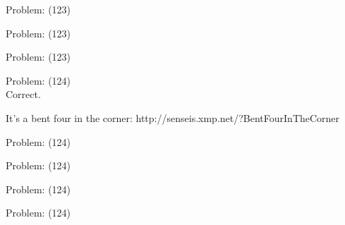 \documentclass[11pt]{article}
\begin{document}
\begin{minipage}[t]{0.5\textwidth}
  {\centering
  
Problem: (123)\\
  }
\end{minipage}
\begin{minipage}[t]{0.5\textwidth}
  {\centering
  
Problem: (123)\\
  }
\end{minipage}
\begin{minipage}[t]{0.5\textwidth}
  {\centering
  
Problem: (123)\\
  }
\end{minipage}
\begin{minipage}[t]{0.5\textwidth}
  {\centering
  
Problem: (124)\\
Correct.

It's a bent four in the corner: http://senseis.xmp.net/?BentFourInTheCorner\\
  }
\end{minipage}
\begin{minipage}[t]{0.5\textwidth}
  {\centering
  
Problem: (124)\\
  }
\end{minipage}
\begin{minipage}[t]{0.5\textwidth}
  {\centering
  
Problem: (124)\\
  }
\end{minipage}
\begin{minipage}[t]{0.5\textwidth}
  {\centering
  
Problem: (124)\\
  }
\end{minipage}
\begin{minipage}[t]{0.5\textwidth}
  {\centering
  
Problem: (124)\\
  }
\end{minipage}
\end{document}
